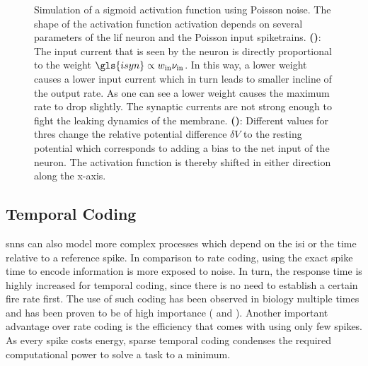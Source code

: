 \begin{figure}
	\begin{subfigure}[c]{0.5\textwidth}
		\centering
		\caption{}
		
		\label{theoreticalactivationfunctionweight}
	\end{subfigure}	
	\begin{subfigure}[c]{0.5\textwidth}
		\centering
		\caption{}
		
		\label{theoreticalactivationfunctionbias}
	\end{subfigure}
	\caption[Simulation of a sigmoid activation function using Poisson noise]{Simulation of a sigmoid activation function using Poisson noise. The shape of the activation function \gls{activation} depends on several parameters of the \gls{lif} neuron and the Poisson input  spiketrains. \textbf{()}: The input current that is seen by the neuron is directly proportional to the weight $\gls{isyn} \propto w_\text{in} \nu_\text{in}$. In this way, a lower weight causes a lower input current which in turn leads to smaller incline of the output rate. As one can see a lower weight causes the maximum rate to drop slightly. The synaptic currents are not strong enough to fight the leaking dynamics of the membrane. \textbf{()}: Different values for \gls{thres} change the relative potential difference $\delta V$ to the resting potential which corresponds to adding a bias to the net input of the neuron. The activation function is thereby shifted in either direction along the x-axis.}
	\label{theoreticalactivationfunction}
\end{figure}

\pagebreak
\subsection{Temporal Coding}
\glspl{snn} can also model more complex processes which depend on the \gls{isi} or the time relative to a reference spike. In comparison to rate coding, using the exact spike time to encode information is more exposed to noise. In turn, the response time is highly increased for temporal coding, since there is no need to establish a certain fire rate first. The use of such coding has been observed in biology multiple times and has been proven to be of high importance (\citealp{gerstner1996neuronal} and \citealp{rieke1999spikes}). Another important advantage over rate coding is the efficiency that comes with using only few spikes. As every spike costs energy, sparse temporal coding condenses the required computational power to solve a task to a minimum. 

